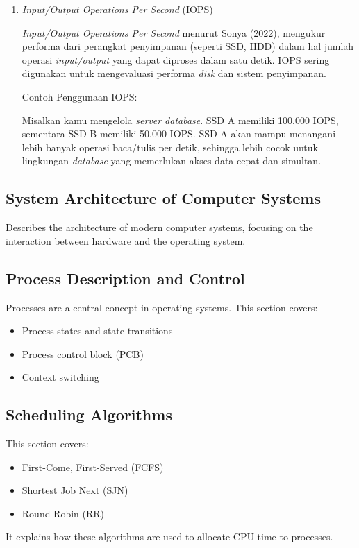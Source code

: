 \documentclass[12pt]{article}
\begin{document}
\begin{enumerate}
    \item \textit{Input/Output Operations Per Second} (IOPS)
    \par \textit{Input/Output Operations Per Second} menurut  Sonya (2022), mengukur performa dari perangkat penyimpanan (seperti SSD, HDD) dalam hal jumlah operasi \textit{input/output} yang dapat diproses dalam satu detik. IOPS sering digunakan untuk mengevaluasi performa \textit{disk} dan sistem penyimpanan.
    \par Contoh Penggunaan IOPS:
    \par Misalkan kamu mengelola \textit{server database}. SSD A memiliki 100,000 IOPS, sementara SSD B memiliki 50,000 IOPS. SSD A akan mampu menangani lebih banyak operasi baca/tulis per detik, sehingga lebih cocok untuk lingkungan \textit{database} yang memerlukan akses data cepat dan simultan.
    
\end{enumerate}



\subsection{System Architecture of Computer Systems}
Describes the architecture of modern computer systems, focusing on the interaction between hardware and the operating system.

\subsection{Process Description and Control}
Processes are a central concept in operating systems. This section covers:
\begin{itemize}
    \item Process states and state transitions
    \item Process control block (PCB)
    \item Context switching
\end{itemize}

\subsection{Scheduling Algorithms}
This section covers:
\begin{itemize}
    \item First-Come, First-Served (FCFS)
    \item Shortest Job Next (SJN)
    \item Round Robin (RR)
\end{itemize}
It explains how these algorithms are used to allocate CPU time to processes.
\end{document}
